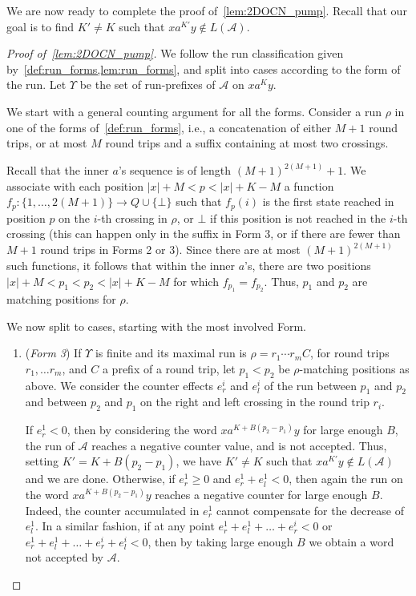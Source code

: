 \documentclass[USenglish]{lipics-v2021}
\newcommand{\shtodo}[1]{\todo[color=cyan!25,size=\small]{SH: #1}}
\newcommand{\cA}{\mathcal{A}}
\begin{document}
We are now ready to complete the proof of~\cref{lem:2DOCN_pump}. Recall that our
goal is to find $K'\neq K$ such that $xa^{K'}y\notin L(\cA)$.
\begin{proof}[Proof of~\cref{lem:2DOCN_pump}]
We follow the run classification given by~\cref{def:run_forms,lem:run_forms},
and split into cases according to the form of the run. Let $\Upsilon$ be the set of
run-prefixes of $\cA$ on $xa^Ky$.

We start with a general counting argument for all the forms. Consider a run
$\rho$ in one of the forms of~\cref{def:run_forms}, i.e., a concatenation of
either $M+1$ round trips, or at most $M$ round trips and a suffix containing
at most two crossings.

Recall that the inner $a$'s sequence is of length $(M+1)^{2(M+1)}+1$. We
associate with each position $|x|+M<p<|x|+K-M$ a function $f_p\colon\{1,\ldots,2(M+1)\}\to
Q\cup \{\bot\}$ such that $f_p(i)$ is the first state reached in position $p$ on the
$i$-th crossing in $\rho$, or $\bot$ if this position is not reached in the $i$-th
crossing (this can happen only in the suffix in Form 3, or if there are fewer
than $M+1$ round trips in Forms 2 or 3). Since there are at most
$(M+1)^{2(M+1)}$ such functions, it follows that within the inner $a$'s, there
are two positions $|x|+M<p_1<p_2<|x|+K-M$ for which $f_{p_1}=f_{p_2}$. Thus,
$p_1$ and $p_2$ are matching positions for $\rho$.

We now split to cases, starting with the most involved Form.
\begin{enumerate}
	\item (\emph{Form 3}) If $\Upsilon$ is finite and its maximal run is $\rho=r_1 \cdots r_m C$,
	for round trips $r_1, \ldots r_m$, and $C$ a prefix of a round trip, let $p_1<p_2$
	be $\rho$-matching positions as above.
	We consider the counter effects $e^i_{r}$ and $e^i_l$ of the run between
	$p_1$ and $p_2$ and between $p_2$ and $p_1$ on the right and left crossing
	in the round trip $r_i$.
	
	If $e^1_{r}<0$, then by considering the word $xa^{K+B(p_2-p_1)}y$ for large
	enough $B$, the run of $\cA$ reaches a negative counter value, and is not
	accepted. Thus, setting $K'=K+B(p_2-p_1)$, we have $K'\neq K$ such that
	$xa^{K'}y\notin L(\cA)$ and we are done.  Otherwise, if $e^1_{r}\ge 0$ and
	$e^1_{r}+e^1_l<0$, then again the run on the word $xa^{K+B(p_2-p_1)}y$
	reaches a negative counter for large enough $B$. Indeed, the counter
	accumulated in $e^1_r$ cannot compensate for the decrease of $e^1_l$.  In a
	similar fashion, if at any point $e^1_r+e^1_l+\ldots +e^i_r<0$ or $e^1_r+e^1_l+\ldots
	+e^i_r +e^i_l<0$, then by taking large enough $B$ we obtain a word not
	accepted by $\cA$.
	

\end{enumerate}
\end{proof}
\end{document}
